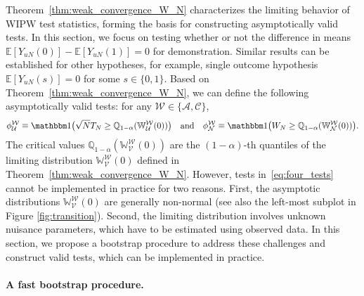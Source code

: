 \documentclass[12pt]{article}
\newcommand{\E}{\mathbb E}								%
\newcommand{\indicator}{\mathbbm 1}						%
\begin{document}
Theorem~\ref{thm:weak_convergence_W_N} characterizes the limiting behavior of WIPW test statistics, forming the basis for constructing asymptotically valid tests. 
In this section, we focus on testing whether or not the difference in means $\E[Y_{uN}(0)]-\E[Y_{uN}(1)]=0$ for demonstration. Similar results can be established for other hypotheses, for example, single outcome hypothesis $\E[Y_{uN}(s)]=0$ for some $s\in\{0,1\}$. Based on Theorem~\ref{thm:weak_convergence_W_N}, we can define the following asymptotically valid tests: for any $\mathcal{W} \in \{\mathcal{A}, \mathcal{C}\}$,
\begin{align}\label{eq:four_tests}
    \phi_{\mathcal{U}}^{\mathcal{W}} \equiv \indicator \big(\sqrt{N}T_N \geq \mathbb{Q}_{1-\alpha}(\mathbb{W}_{\mathcal{U}}^{\mathcal{W}}(0))\big)\quad\text{and}\quad\phi_{\mathcal{N}}^{\mathcal{W}} \equiv \indicator \big(W_N \geq \mathbb{Q}_{1-\alpha}(\mathbb{W}_{\mathcal{N}}^{\mathcal{W}}(0))\big).
\end{align}
The critical values \(\mathbb{Q}_{1-\alpha}(\mathbb{W}_{\mathcal{V}}^{\mathcal{W}}(0))\) are the \((1-\alpha)\)-th quantiles of the limiting distribution \(\mathbb{W}_{\mathcal{V}}^{\mathcal{W}}(0)\) defined in Theorem~\ref{thm:weak_convergence_W_N}. However, tests in~\eqref{eq:four_tests} cannot be implemented in practice for two reasons. First, the asymptotic distributions \(\mathbb{W}_{\mathcal{V}}^{\mathcal{W}}(0)\) are generally non-normal (see also the left-most subplot in Figure \ref{fig:transition}). Second, the limiting distribution involves unknown nuisance parameters, which have to be estimated using observed data. In this section, we propose a bootstrap procedure to address these challenges and construct valid tests, which can be implemented in practice.

\paragraph{A fast bootstrap procedure.} 
\end{document}
